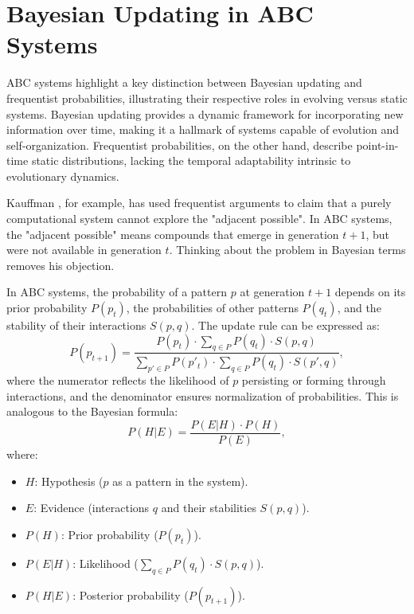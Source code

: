 \documentclass[entropy,article,submit,pdftex,moreauthors]{Definitions/mdpi}
\begin{document}
\section{Bayesian Updating in ABC Systems}

ABC systems highlight a key distinction between Bayesian \cite{mcgrayne2011theory} updating and frequentist probabilities, illustrating their respective roles in evolving versus static systems. Bayesian updating provides a dynamic framework for incorporating new information over time, making it a hallmark of systems capable of evolution and self-organization. Frequentist probabilities, on the other hand, describe point-in-time static distributions, lacking the temporal adaptability intrinsic to evolutionary dynamics.

Kauffman \cite{kauffman2000investigations}, for example, has used frequentist arguments to claim that a purely computational system cannot explore the "adjacent possible". In ABC systems, the "adjacent possible" means compounds that emerge in generation \(t+1\), but were not available in generation \(t\). Thinking about the problem in Bayesian terms removes his objection.

In ABC systems, the probability of a pattern \( p \) at generation \( t+1 \) depends on its prior probability \( P(p_t) \), the probabilities of other patterns \( P(q_t) \), and the stability of their interactions \( S(p, q) \). The update rule can be expressed as:
\[
P(p_{t+1}) = \frac{P(p_t) \cdot \sum_{q \in P} P(q_t) \cdot S(p, q)}{\sum_{p' \in P} P(p'_t) \cdot \sum_{q \in P} P(q_t) \cdot S(p', q)},
\]
where the numerator reflects the likelihood of \( p \) persisting or forming through interactions, and the denominator ensures normalization of probabilities. This is analogous to the Bayesian formula:
\[
P(H|E) = \frac{P(E|H) \cdot P(H)}{P(E)},
\]
where:
\begin{itemize}
    \item[] \( H \): Hypothesis (\( p \) as a pattern in the system).
    \item[] \( E \): Evidence (interactions \( q \) and their stabilities \( S(p, q) \)).
    \item[] \( P(H) \): Prior probability (\( P(p_t) \)).
    \item[] \( P(E|H) \): Likelihood (\( \sum_{q \in P} P(q_t) \cdot S(p, q) \)).
    \item[] \( P(H|E) \): Posterior probability (\( P(p_{t+1}) \)).
\end{itemize}
\end{document}
